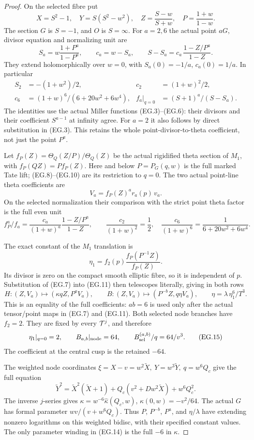\begin{proof}
On the selected fibre put
\[
 X=S^2-1,\quad Y=S(S^2-w^2),\quad
 Z=\frac{S-w}{S+w},\quad P=\frac{1+w}{1-w}.
 \tag{EG.8}
\]
The section \(G\) is \(S=-1\), and \(O\) is \(S=\infty\).
For \(a=2,6\) the actual point \(aG\), divisor equation and
normalizing unit are
\[
 S_a=w\frac{1+P^a}{1-P^a},\qquad c_a=w-S_a,\qquad
 S-S_a=c_a\,\frac{1-Z/P^a}{1-Z}.
 \tag{EG.9}
\]
They extend holomorphically over \(w=0\), with
\(S_a(0)=-1/a\), \(c_a(0)=1/a\). In particular
\[
 \begin{aligned}
 S_2&=-(1+w^2)/2,&c_2&=(1+w)^2/2,\\
 c_6&=(1+w)^6/(6+20w^2+6w^4),&
 f_a|_{q=0}&=(S+1)^a/(S-S_a).
 \end{aligned}
 \tag{EG.10}
\]
The identities use the actual Miller functions (EG.3)--(EG.6):
their divisors and their coefficient \(S^{a-1}\) at infinity
agree. For \(a=2\) it also follows by direct substitution in
(EG.3). This retains the whole point-divisor-to-theta coefficient,
not just the point \(P^a\).

Let \(f_P(Z)=\Theta_Q(Z/P)/\Theta_Q(Z)\) be the actual rigidified
theta section of \(M_1\), with \(f_P(QZ)=P f_P(Z)\).
Here and below \(P=P_G(q,w)\) is the full marked Tate lift;
(EG.8)--(EG.10) are its restriction to \(q=0\).
The two actual point-line theta coefficients are
\[
 V_a=f_P(Z)^a r_a(p)\,v_a .
 \tag{EG.11}
\]
On the selected normalization their comparison with the strict
point theta factor is the full even unit
\[
 f_P^a/f_a=\frac{c_a}{(1+w)^a}
                   \frac{1-Z/P^a}{1-Z},\qquad
 \frac{c_2}{(1+w)^2}=\frac12,\quad
 \frac{c_6}{(1+w)^6}=\frac1{6+20w^2+6w^4}.
 \tag{EG.12}
\]

The exact constant of the \(M_1\) translation is
\[
 \eta_1=f_2(p)\frac{f_P(P^{-1}Z)}{f_P(Z)} .
 \tag{EG.13}
\]
Its divisor is zero on the compact smooth elliptic fibre, so it
is independent of \(p\). Substitution of (EG.7) into (EG.11)
then telescopes literally, giving in both rows
\[
 H:(Z,V_a)\mapsto(\kappa q Z,P^aV_a),\qquad
 B:(Z,V_a)\mapsto(P^{-b}Z,q\eta V_a),\qquad
 \eta=\lambda\,\eta_1^6/T^3 .
 \tag{EG.14}
\]
This is an equality of the full coefficients: \(ab=6\) is used
only after the actual tensor/point maps in (EG.7) and (EG.11).
Both selected node branches have \(f_2=2\). They are fixed by
every \({\cal T}^j\), and therefore
\[
 \eta_1|_{q=0}=2,\qquad
 B_{a,b}|_{\rm node}=64,\qquad
 B_{\rm sel}^{(a,b)}/q=64/v^3 .
 \tag{EG.15}
\]
The coefficient at the central cusp is the retained \(-64\).

The weighted node coordinates
\(\xi=X-v=w^2\widetilde X,\ Y=w^3\widetilde Y,\
q=w^6Q_c\) give the full equation
\[
 \widetilde Y^2=\widetilde X^2(\widetilde X+1)
       +Q_c(v^2+Dw^2\widetilde X)+w^6Q_c^2 .
 \tag{EG.16}
\]
The inverse \(j\)-series gives
\(\kappa=w^{-6}\widehat\kappa(Q_c,w)\),
\(\widehat\kappa(0,w)=-v^2/64\).
The actual \(G\) has formal parameter
\(wv/(v+w^6Q_c)\). Thus \(P\), \(P^{-b}\), \(P^a\), and
\(\eta/\lambda\) have extending nonzero logarithms on this
weighted bidisc, with their specified constant values. The only
parameter winding in (EG.14) is the full \(-6\) in \(\kappa\).


\end{proof}
